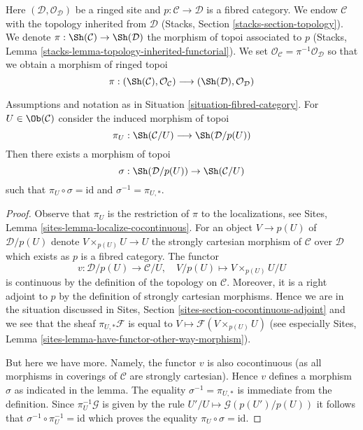 \begin{situation}
\label{situation-fibred-category}
Here $(\mathcal{D}, \mathcal{O}_\mathcal{D})$ be a ringed site
and $p : \mathcal{C} \to \mathcal{D}$ is a fibred category. We endow
$\mathcal{C}$ with the topology inherited from $\mathcal{D}$
(Stacks, Section \ref{stacks-section-topology}). We denote
$\pi : \Sh(\mathcal{C}) \to \Sh(\mathcal{D})$ the morphism of
topoi associated to $p$
(Stacks, Lemma \ref{stacks-lemma-topology-inherited-functorial}).
We set $\mathcal{O}_\mathcal{C} = \pi^{-1}\mathcal{O}_\mathcal{D}$
so that we obtain a morphism of ringed topoi
$$
\pi :
(\Sh(\mathcal{C}), \mathcal{O}_\mathcal{C})
\longrightarrow
(\Sh(\mathcal{D}), \mathcal{O}_\mathcal{D})
$$
\end{situation}

\begin{lemma}
\label{lemma-fibred-category-with-object}
Assumptions and notation as in Situation \ref{situation-fibred-category}.
For $U \in \Ob(\mathcal{C})$ consider the induced morphism
of topoi
$$
\pi_U : \Sh(\mathcal{C}/U) \longrightarrow \Sh(\mathcal{D}/p(U))
$$
Then there exists a morphism of topoi
$$
\sigma : \Sh(\mathcal{D}/p(U)) \to \Sh(\mathcal{C}/U)
$$
such that $\pi_U \circ \sigma = \text{id}$ and $\sigma^{-1} = \pi_{U, *}$.
\end{lemma}

\begin{proof}
Observe that $\pi_U$ is the restriction of $\pi$ to the localizations, see
Sites, Lemma \ref{sites-lemma-localize-cocontinuous}.
For an object $V \to p(U)$ of $\mathcal{D}/p(U)$ denote
$V \times_{p(U)} U \to U$ the strongly cartesian morphism of $\mathcal{C}$
over $\mathcal{D}$ which exists as $p$ is a fibred category.
The functor
$$
v : \mathcal{D}/p(U) \to \mathcal{C}/U,\quad
V/p(U) \mapsto V \times_{p(U)} U/U
$$
is continuous by the definition of the topology on $\mathcal{C}$.
Moreover, it is a right adjoint to $p$ by the definition of strongly
cartesian morphisms. Hence we are in the situation discussed in
Sites, Section \ref{sites-section-cocontinuous-adjoint}
and we see that the sheaf $\pi_{U, *}\mathcal{F}$
is equal to $V \mapsto \mathcal{F}(V \times_{p(U)} U)$
(see especially Sites, Lemma
\ref{sites-lemma-have-functor-other-way-morphism}).

\medskip\noindent
But here we have more. Namely, the functor $v$
is also cocontinuous (as all morphisms in coverings of $\mathcal{C}$ 
are strongly cartesian). Hence $v$ defines a morphism $\sigma$ as
indicated in the lemma. The equality $\sigma^{-1} = \pi_{U, *}$
is immediate from the definition. Since $\pi_U^{-1}\mathcal{G}$
is given by the rule $U'/U \mapsto \mathcal{G}(p(U')/p(U))$
it follows that $\sigma^{-1} \circ \pi_U^{-1} = \text{id}$
which proves the equality
$\pi_U \circ \sigma = \text{id}$.
\end{proof}

